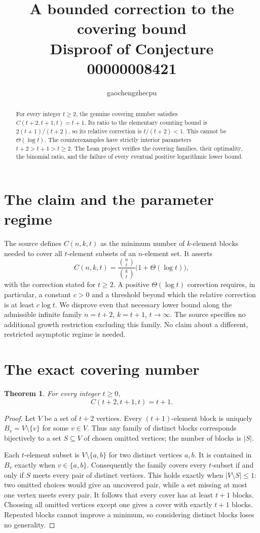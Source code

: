 \documentclass[11pt]{article}
\title{A bounded correction to the covering bound\\
\large Disproof of Conjecture 00000008421}
\author{gaochengzhecpu}
\date{}
\newtheorem{theorem}{Theorem}
\begin{document}
\maketitle
\begin{abstract}
For every integer $t\geq2$, the genuine covering number satisfies
$C(t+2,t+1,t)=t+1$. Its ratio to the elementary counting bound is
$2(t+1)/(t+2)$, so its relative correction is $t/(t+2)<1$.
This cannot be $\Theta(\log t)$. The counterexamples have strictly
interior parameters $t+2>t+1>t\geq2$. The Lean project verifies the
covering families, their optimality, the binomial ratio, and the failure
of every eventual positive logarithmic lower bound.
\end{abstract}

\section*{The claim and the parameter regime}
The source defines $C(n,k,t)$ as the minimum number of $k$-element
blocks needed to cover all $t$-element subsets of an $n$-element set.
It asserts
\[
 C(n,k,t)=\frac{\binom nt}{\binom kt}\bigl(1+\Theta(\log t)\bigr),
\]
with the correction stated for $t\geq2$. A positive
$\Theta(\log t)$ correction requires, in particular, a constant $c>0$
and a threshold beyond which the relative correction is at least
$c\log t$. We disprove even that necessary lower bound along the
admissible infinite family $n=t+2$, $k=t+1$, $t\to\infty$.
The source specifies no additional growth restriction excluding this
family. No claim about a different, restricted asymptotic regime is needed.

\section*{The exact covering number}
\begin{theorem}
For every integer $t\geq0$,
\[
 C(t+2,t+1,t)=t+1.
\]
\end{theorem}
\begin{proof}
Let $V$ be a set of $t+2$ vertices. Every $(t+1)$-element block is
uniquely $B_v=V\setminus\{v\}$ for some $v\in V$. Thus any family of
distinct blocks corresponds bijectively to a set $S\subseteq V$ of
chosen omitted vertices; the number of blocks is $|S|$.

Each $t$-element subset is $V\setminus\{a,b\}$ for two distinct
vertices $a,b$. It is contained in $B_v$ exactly when $v\in\{a,b\}$.
Consequently the family covers every $t$-subset if and only if $S$
meets every pair of distinct vertices. This holds exactly when
$|V\setminus S|\leq1$: two omitted choices would give an uncovered
pair, while a set missing at most one vertex meets every pair.
It follows that every cover has at least $t+1$ blocks. Choosing all
omitted vertices except one gives a cover with exactly $t+1$ blocks.
Repeated blocks cannot improve a minimum, so considering distinct
blocks loses no generality.
\end{proof}
\end{document}
